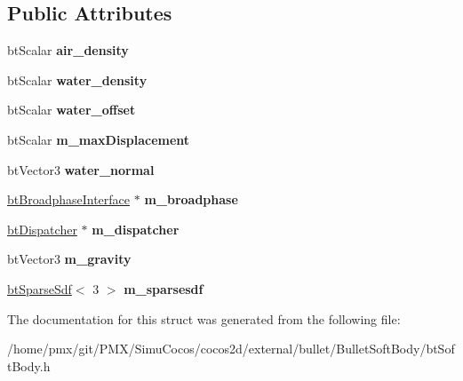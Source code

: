 \subsection*{Public Attributes}
\begin{DoxyCompactItemize}
\item 
\mbox{\label{structbtSoftBodyWorldInfo_a2a8dbb3c18aee460ad9651de8fd99954}} 
bt\+Scalar {\bfseries air\+\_\+density}
\item 
\mbox{\label{structbtSoftBodyWorldInfo_a8a0447459bbe2965434cea84389940ef}} 
bt\+Scalar {\bfseries water\+\_\+density}
\item 
\mbox{\label{structbtSoftBodyWorldInfo_ae790a85517d8d70e4f68b0f97e409370}} 
bt\+Scalar {\bfseries water\+\_\+offset}
\item 
\mbox{\label{structbtSoftBodyWorldInfo_adf4545a58f7bc4075443d77e2ce82a44}} 
bt\+Scalar {\bfseries m\+\_\+max\+Displacement}
\item 
\mbox{\label{structbtSoftBodyWorldInfo_adc5ede5999551857f42510565b328317}} 
bt\+Vector3 {\bfseries water\+\_\+normal}
\item 
\mbox{\label{structbtSoftBodyWorldInfo_afd9ac8c00b3df5f3134ea448d237209e}} 
\hyperlink{classbtBroadphaseInterface}{bt\+Broadphase\+Interface} $\ast$ {\bfseries m\+\_\+broadphase}
\item 
\mbox{\label{structbtSoftBodyWorldInfo_a4cdb28e69f0f3e14335d8519d7e4be49}} 
\hyperlink{classbtDispatcher}{bt\+Dispatcher} $\ast$ {\bfseries m\+\_\+dispatcher}
\item 
\mbox{\label{structbtSoftBodyWorldInfo_ab2c7540c1556ddfb5adb6aeb2fee3392}} 
bt\+Vector3 {\bfseries m\+\_\+gravity}
\item 
\mbox{\label{structbtSoftBodyWorldInfo_aa8b999bc3c2548d043c07115fd45cceb}} 
\hyperlink{structbtSparseSdf}{bt\+Sparse\+Sdf}$<$ 3 $>$ {\bfseries m\+\_\+sparsesdf}
\end{DoxyCompactItemize}


The documentation for this struct was generated from the following file\+:\begin{DoxyCompactItemize}
\item 
/home/pmx/git/\+P\+M\+X/\+Simu\+Cocos/cocos2d/external/bullet/\+Bullet\+Soft\+Body/bt\+Soft\+Body.\+h\end{DoxyCompactItemize}
